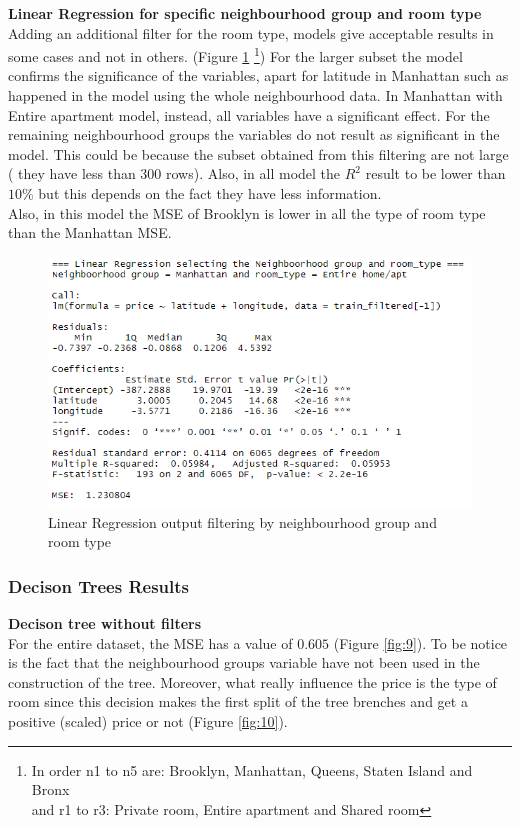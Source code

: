 \documentclass{FR16}
\begin{document}
\newpage
\noindent \textbf{Linear Regression for specific neighbourhood group and room type}\\
\noindent Adding an additional filter for the room type, models give acceptable results in some cases and not in others. (Figure \ref{fig:7} \footnote{In order n1 to n5 are: Brooklyn, Manhattan, Queens, Staten Island and Bronx \\ and r1 to r3: Private room, Entire apartment and Shared room}) 
For the larger subset the model confirms the significance of the variables, apart for latitude in Manhattan such as happened in the model using the whole neighbourhood data. In Manhattan with Entire apartment model, instead, all variables have a significant effect. For the remaining neighbourhood groups the variables do not result as significant in the model. This could be because the subset obtained from this filtering are not large ( they have less than 300 rows). Also, in all model the $R^2$ result to be lower than $10\%$ but this depends on the fact they have less information.
\\
Also, in this model the MSE of Brooklyn is lower in all the type of room type than the Manhattan MSE. 
\begin{figure}[H]
\centering
\includegraphics[width=1\textwidth]{figures/lm3.PNG} 
\caption{\label{fig:7}  Linear Regression output filtering by neighbourhood group and room type }
\end{figure}




\newpage 
\subsubsection{Decison Trees Results}
\textbf{Decison tree  without filters}\\
\noindent For the entire dataset, the MSE has a value of $0.605$ (Figure \ref{fig:9}). To be notice is the fact that the neighbourhood groups variable have not been used in the construction of the tree. Moreover, what really influence the price is the type of room since this decision makes the first split of the tree brenches and get a positive (scaled) price or not (Figure \ref{fig:10}).
\end{document}
